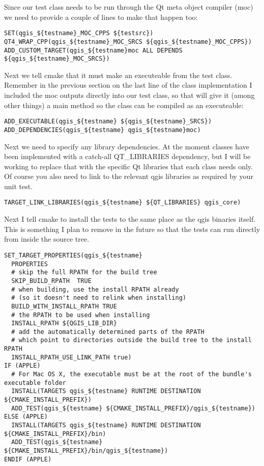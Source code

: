 Since our test class needs to be run through the Qt meta object compiler (moc)
we need to provide a couple of lines to make that happen too:

\begin{verbatim}
SET(qgis_${testname}_MOC_CPPS ${testsrc})
QT4_WRAP_CPP(qgis_${testname}_MOC_SRCS ${qgis_${testname}_MOC_CPPS})
ADD_CUSTOM_TARGET(qgis_${testname}moc ALL DEPENDS ${qgis_${testname}_MOC_SRCS})
\end{verbatim}

Next we tell cmake that it must make an executeable from the test class.
Remember in the previous section on the last line of the class implementation I
included the moc outputs directly into our test class, so that will give it
(among other things) a main method so the class can be compiled as an
executeable:

\begin{verbatim}
ADD_EXECUTABLE(qgis_${testname} ${qgis_${testname}_SRCS})
ADD_DEPENDENCIES(qgis_${testname} qgis_${testname}moc)
\end{verbatim}

Next we need to specify any library dependencies. At the moment classes have
been implemented with a catch-all QT\_LIBRARIES dependency, but I will be
working to replace that with the specific Qt libraries that each class needs
only. Of course you also need to link to the relevant qgis libraries as
required by your unit test.

\begin{verbatim}
TARGET_LINK_LIBRARIES(qgis_${testname} ${QT_LIBRARIES} qgis_core)
\end{verbatim}

Next I tell cmake to install the tests to the same place as the qgis binaries
itself. This is something I plan to remove in the future so that the tests can
run directly from inside the source tree.

\begin{verbatim}
SET_TARGET_PROPERTIES(qgis_${testname}
  PROPERTIES
  # skip the full RPATH for the build tree
  SKIP_BUILD_RPATH  TRUE
  # when building, use the install RPATH already
  # (so it doesn't need to relink when installing)
  BUILD_WITH_INSTALL_RPATH TRUE
  # the RPATH to be used when installing
  INSTALL_RPATH ${QGIS_LIB_DIR}
  # add the automatically determined parts of the RPATH
  # which point to directories outside the build tree to the install RPATH
  INSTALL_RPATH_USE_LINK_PATH true)
IF (APPLE)
  # For Mac OS X, the executable must be at the root of the bundle's executable folder
  INSTALL(TARGETS qgis_${testname} RUNTIME DESTINATION ${CMAKE_INSTALL_PREFIX})
  ADD_TEST(qgis_${testname} ${CMAKE_INSTALL_PREFIX}/qgis_${testname})
ELSE (APPLE)
  INSTALL(TARGETS qgis_${testname} RUNTIME DESTINATION ${CMAKE_INSTALL_PREFIX}/bin)
  ADD_TEST(qgis_${testname} ${CMAKE_INSTALL_PREFIX}/bin/qgis_${testname})
ENDIF (APPLE)
\end{verbatim}

